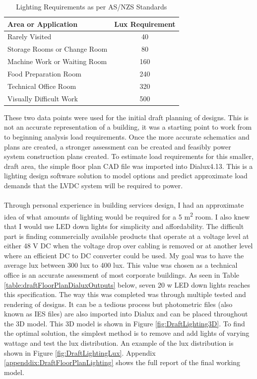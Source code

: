 \begin{table}[H]
\centering
\renewcommand{\arraystretch}{2}
\begin{tabular}{|l|c|}
\hline
\textbf{Area or Application} 	& \textbf{Lux Requirement} \\ \hline
Rarely Visited 					& 40 \\ \hline
Storage Rooms or Change Room 	& 80 \\ \hline
Machine Work or Waiting Room 	& 160 \\ \hline
Food Preparation Room 			& 240 \\ \hline
Technical Office Room 			& 320 \\ \hline
Visually Difficult Work 		& 500 \\ \hline
\end{tabular}
\caption{Lighting Requirements as per AS/NZS Standards \cite{StandardsAustralia2006_2}}
\label{table:LightingRequirements}
\end{table}

These two data points were used for the initial draft planning of designs. This is not an accurate representation of a building, it was a starting point to work from to beginning analysis load requirements. Once the more accurate schematics and plans are created, a stronger assessment can be created and feasibly power system construction plans created. To estimate load requirements for this smaller, draft area, the simple floor plan CAD file was imported into Dialux4.13. This is a lighting design software solution to model options and predict approximate load demands that the LVDC system will be required to power.  

\paragraph{}
Through personal experience in building services design, I had an approximate idea of what amounts of lighting would be required for a 5 \si{m^2} room. I also knew that I would use LED down lights for simplicity and affordability. The difficult part is finding commercially available products that operate at a voltage level at either 48 V DC when the voltage drop over cabling is removed or at another level where an efficient DC to DC converter could be used. My goal was to have the average lux between 300 \si{lux} to 400 \si{lux}. This value was chosen as a technical office is an accurate assessment of most corporate buildings. As seen in Table \ref{table:draftFloorPlanDialuxOutputs} below, seven 20 \si{w} LED down lights reaches this specification. The way this was completed was through multiple tested and rendering of designs. It can be a tedious process but photometric files (also known as IES files) are also imported into Dialux and can be placed throughout the 3D model. This 3D model is shown in Figure \ref{fig:DraftLighting3D}. To find the optimal solution, the simplest method is to remove and add lights of varying wattage and test the lux distribution. An example of the lux distribution is shown in Figure \ref{fig:DraftLightingLux}. Appendix \ref{appenddix:DraftFloorPlanLighting} shows the full report of the final working model.   

